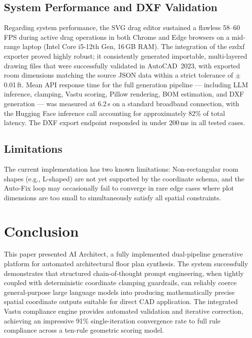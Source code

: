 \documentclass[10pt, twocolumn, letterpaper]{article}
\begin{document}
\subsection{System Performance and DXF Validation}

Regarding system performance, the SVG drag editor sustained a flawless 58--60\,FPS
during active drag operations in both Chrome and Edge browsers on a mid-range
laptop (Intel Core i5-12th Gen, 16\,GB RAM). The integration of the ezdxf
exporter proved highly robust; it consistently generated importable,
multi-layered drawing files that were successfully validated in AutoCAD~2023,
with exported room dimensions matching the source JSON data within a strict
tolerance of $\pm$0.01\,ft. Mean API response time for the full generation
pipeline --- including LLM inference, clamping, Vastu scoring, Pillow
rendering, BOM estimation, and DXF generation --- was measured at 6.2\,s on a standard
broadband connection, with the Hugging Face inference call accounting for
approximately 82\% of total latency. The DXF export endpoint responded in
under 200\,ms in all tested cases.

\subsection{Limitations}

The current implementation has two known limitations: Non-rectangular room shapes (e.g., L-shaped) are not yet supported by the coordinate schema, and the Auto-Fix loop may occasionally fail to converge in rare edge cases where plot dimensions are too small to simultaneously satisfy all spatial constraints.

\section{Conclusion}

This paper presented AI Architect, a fully implemented dual-pipeline
generative platform for automated architectural floor plan synthesis. The
system successfully demonstrates that structured chain-of-thought prompt
engineering, when tightly coupled with deterministic coordinate clamping
guardrails, can reliably coerce general-purpose large language models into
producing mathematically precise spatial coordinate outputs suitable for direct
CAD application. The integrated Vastu compliance engine provides automated
validation and iterative correction, achieving an impressive 91\%
single-iteration convergence rate to full rule compliance across a ten-rule
geometric scoring model.
\end{document}
